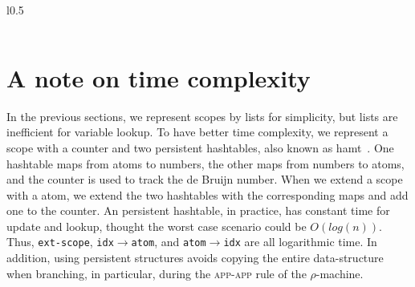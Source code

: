 \documentclass[a4paper,UKenglish]{lipics-v2016}
\newcommand{\clos}[2] {
  \langle #1; #2 \rangle
}
\newcommand{\app}[2] {
  (#1\, #2)
}
\newcommand{\pr}[2] {
 (#1\, #2)
}
\newcommand{\bd}[2] {
 #1/ #2
}
\newcommand*{\transname}[1]{\textsc{#1}}
\begin{document}
\begin{wrapfigure}{l}{0.5\textwidth}
\begin{minipage}[b]{0.4\textwidth}
\begin{tabular}{l}

  \end{tabular}
  \end{minipage}
\end{wrapfigure}

\section{A note on time complexity}
    \label{efficiency}

In the previous sections, we represent scopes by lists for simplicity,
but lists are inefficient for variable lookup.  To have better time
complexity, we represent a scope with a counter and two persistent
hashtables, also known as hamt~\citep{bagwell_ideal_2001}.  One
hashtable maps from atoms to numbers, the other maps from numbers to
atoms, and the counter is used to track the de Bruijn number.  When we
extend a scope with a atom, we extend the two hashtables with the
corresponding maps and add one to the counter.  An persistent
hashtable, in practice, has constant time for update and lookup,
thought the worst case scenario could be $O(log(n))$.  Thus,
\texttt{ext-scope}, \texttt{idx$\rightarrow$atom}, and
\texttt{atom$\rightarrow$idx} are all logarithmic time.  In addition,
using persistent structures avoids copying the entire data-structure
when branching, in particular, during the \transname{app-app} rule of
the $\rho$-machine.
\end{document}
